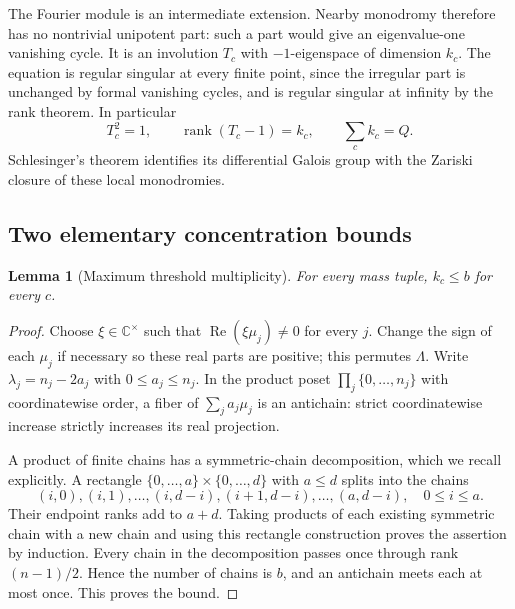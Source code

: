 \documentclass[11pt,a4paper]{article}
\newtheorem{lemma}[theorem]{Lemma}
\theoremstyle{definition}
\theoremstyle{remark}
\numberwithin{equation}{section}
\begin{document}
The Fourier module is an intermediate extension. Nearby monodromy
therefore has no nontrivial unipotent part: such a part would give
an eigenvalue-one vanishing cycle. It is an involution $T_c$ with
$-1$-eigenspace of dimension $k_c$. The equation is regular singular
at every finite point, since the irregular part is unchanged by
formal vanishing cycles, and is regular singular at infinity by the
rank theorem. In particular
\begin{equation}\label{p7:gn:budget}
 T_c^2=1,\qquad \operatorname{rank}(T_c-1)=k_c,
                       \qquad\sum_c k_c=Q.
\end{equation}
Schlesinger's theorem identifies its differential Galois group
with the Zariski closure of these local monodromies.

\subsection{Two elementary concentration bounds}

\begin{lemma}[Maximum threshold multiplicity]\label{p7:gn:fiber}
For every mass tuple, $k_c\le b$ for every $c$.
\end{lemma}
\begin{proof}
Choose $\xi\in\mathbb C^\times$ such that
$\operatorname{Re}(\xi\mu_j)\ne0$ for every $j$. Change the sign
of each $\mu_j$ if necessary so these real parts are positive;
this permutes $\Lambda$. Write $\lambda_j=n_j-2a_j$ with
$0\le a_j\le n_j$. In the product poset
$\prod_j\{0,\ldots,n_j\}$ with coordinatewise order, a fiber of
$\sum_j a_j\mu_j$ is an antichain: strict coordinatewise increase
strictly increases its real projection.

A product of finite chains has a symmetric-chain decomposition,
which we recall explicitly. A rectangle $\{0,\ldots,a\}\times
\{0,\ldots,d\}$ with $a\le d$ splits into the chains
\[
 (i,0),(i,1),\ldots,(i,d-i),(i+1,d-i),\ldots,(a,d-i),
                  \quad 0\le i\le a.
\]
Their endpoint ranks add to $a+d$. Taking products of each existing
symmetric chain with a new chain and using this rectangle construction
proves the assertion by induction. Every chain in the decomposition
passes once through rank $(n-1)/2$. Hence the number of chains is
$b$, and an antichain meets each at most once. This proves the bound.
\end{proof}
\end{document}
